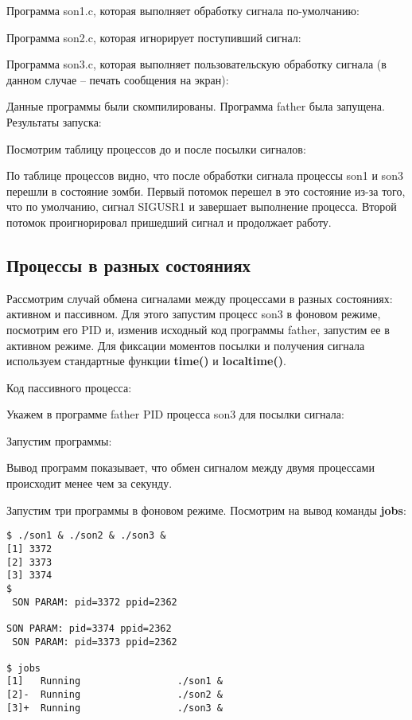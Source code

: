 \documentclass[a4paper]{article}
\begin{document}
	Программа son1.c, которая выполняет обработку сигнала по-умолчанию:
	
	
	Программа son2.c, которая игнорирует поступивший сигнал:
	
	
	Программа son3.c, которая выполняет пользовательскую обработку сигнала (в данном случае -- печать сообщения на экран):
	
	
	Данные программы были скомпилированы. Программа father была запущена. Результаты запуска:	
	
	
	Посмотрим таблицу процессов до и после посылки сигналов:
	
	
	По таблице процессов видно, что после обработки сигнала процессы son1 и son3 перешли в состояние зомби. Первый потомок перешел в это состояние из-за того, что по умолчанию, сигнал SIGUSR1 и  завершает выполнение процесса. Второй потомок проигнорировал пришедший сигнал и продолжает работу.
	
	\subsection{Процессы в разных состояниях}
	Рассмотрим случай обмена сигналами между процессами в разных состояниях: активном и пассивном. Для этого запустим процесс son3 в фоновом режиме, посмотрим его PID и, изменив исходный код программы father, запустим ее в активном режиме. Для фиксации моментов посылки и получения сигнала используем стандартные функции \textbf{time()} и \textbf{localtime()}.
	
	Код пассивного процесса:
	

	Укажем в программе father PID процесса son3 для посылки сигнала:
	
	
	Запустим программы:
	
	
	Вывод программ показывает, что обмен сигналом между двумя процессами происходит менее чем за секунду.
	
	Запустим три программы в фоновом режиме. Посмотрим на вывод команды \textbf{jobs}:
	\begin{lstlisting}[style=crs_bash]
$ ./son1 & ./son2 & ./son3 &
[1] 3372
[2] 3373
[3] 3374
$ 
 SON PARAM: pid=3372 ppid=2362 

SON PARAM: pid=3374 ppid=2362 
 SON PARAM: pid=3373 ppid=2362 

$ jobs
[1]   Running                 ./son1 &
[2]-  Running                 ./son2 &
[3]+  Running                 ./son3 &
	\end{lstlisting}
\end{document}
